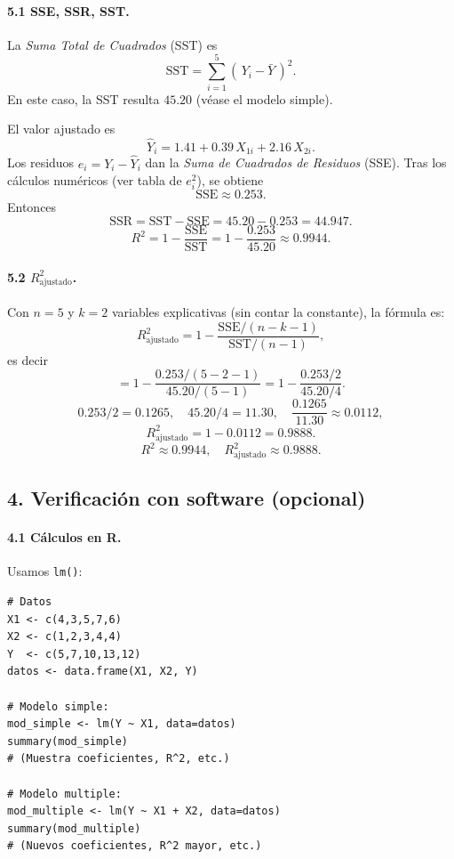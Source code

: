 \documentclass[10pt,a4paper]{article}
\begin{document}
\paragraph{5.1 SSE, SSR, SST.}

La \emph{Suma Total de Cuadrados} (SST) es
\[
\text{SST}
= \sum_{i=1}^5 (\,Y_i - \bar{Y}\,)^2.
\]
En este caso, la SST resulta $45.20$ (véase el modelo simple).  

El valor ajustado es
\[
\hat{Y}_i
= 1.41 + 0.39\,X_{1i} + 2.16\,X_{2i}.
\]
Los residuos $e_i=Y_i-\hat{Y}_i$ dan la \emph{Suma de Cuadrados de Residuos} (SSE). Tras los cálculos numéricos (ver tabla de $e_i^2$), se obtiene
\[
\text{SSE} \approx 0.253.
\]
Entonces
\[
\text{SSR}
= \text{SST} - \text{SSE}
= 45.20 - 0.253
= 44.947.
\]
\[
R^2
= 1-\frac{\text{SSE}}{\text{SST}}
= 1 - \frac{0.253}{45.20}
\approx 0.9944.
\]

\paragraph{5.2 $R_{\text{ajustado}}^2$.}

Con $n=5$ y $k=2$ variables explicativas (sin contar la constante), la fórmula es:
\[
R_{\text{ajustado}}^2
= 1
- 
\frac{\text{SSE}/(n-k-1)}{\text{SST}/(n-1)},
\]
es decir
\[
= 1
- 
\frac{0.253/(5-2-1)}{45.20/(5-1)}
= 1
- 
\frac{0.253/2}{45.20/4}.
\]
\[
0.253/2 = 0.1265,
\quad
45.20/4=11.30,
\quad
\frac{0.1265}{11.30}\approx 0.0112,
\]
\[
R_{\text{ajustado}}^2
= 1-0.0112
= 0.9888.
\]
\[
\boxed{
R^2 \approx 0.9944,
\quad
R_{\text{ajustado}}^2 \approx 0.9888.
}
\]



\subsection*{4. Verificaci\'on con software (opcional)}

\paragraph{4.1 C\'alculos en R.} Usamos \texttt{lm()}:

\begin{verbatim}
# Datos
X1 <- c(4,3,5,7,6)
X2 <- c(1,2,3,4,4)
Y  <- c(5,7,10,13,12)
datos <- data.frame(X1, X2, Y)

# Modelo simple:
mod_simple <- lm(Y ~ X1, data=datos)
summary(mod_simple)
# (Muestra coeficientes, R^2, etc.)

# Modelo multiple:
mod_multiple <- lm(Y ~ X1 + X2, data=datos)
summary(mod_multiple)
# (Nuevos coeficientes, R^2 mayor, etc.)
\end{verbatim}
\end{document}
